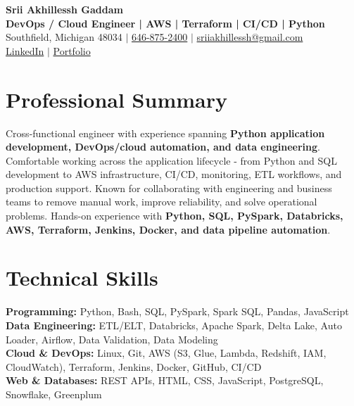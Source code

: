 \documentclass[letterpaper,10pt]{article}
\begin{document}
\fontsize{9.35pt}{10.45pt}\selectfont

\begin{center}
    {\LARGE \textbf{Srii Akhillessh Gaddam}} \\[-1pt]
    \textbf{DevOps / Cloud Engineer | AWS | Terraform | CI/CD | Python} \\[2pt]
    Southfield, Michigan 48034 $|$
    \href{tel:6468752400}{646-875-2400} $|$
    \href{mailto:sriiakhillessh@gmail.com}{sriiakhillessh@gmail.com} \\[1pt]
    \href{https://www.linkedin.com/in/srii-akhiilessh-gaddam-b48668191/}{LinkedIn} $|$
    \href{https://sriiakhillesshg.github.io/portfolio/}{Portfolio}
\end{center}
\vspace{-8pt}

\section{Professional Summary}
\small{Cross-functional engineer with experience spanning \textbf{Python application development, DevOps/cloud automation, and data engineering}. Comfortable working across the application lifecycle - from Python and SQL development to AWS infrastructure, CI/CD, monitoring, ETL workflows, and production support. Known for collaborating with engineering and business teams to remove manual work, improve reliability, and solve operational problems. Hands-on experience with \textbf{Python, SQL, PySpark, Databricks, AWS, Terraform, Jenkins, Docker, and data pipeline automation}.}

\section{Technical Skills}
\small{
\textbf{Programming:} Python, Bash, SQL, PySpark, Spark SQL, Pandas, JavaScript \\
\textbf{Data Engineering:} ETL/ELT, Databricks, Apache Spark, Delta Lake, Auto Loader, Airflow, Data Validation, Data Modeling \\
\textbf{Cloud \& DevOps:} Linux, Git, AWS (S3, Glue, Lambda, Redshift, IAM, CloudWatch), Terraform, Jenkins, Docker, GitHub, CI/CD \\
\textbf{Web \& Databases:} REST APIs, HTML, CSS, JavaScript, PostgreSQL, Snowflake, Greenplum
}
\end{document}
